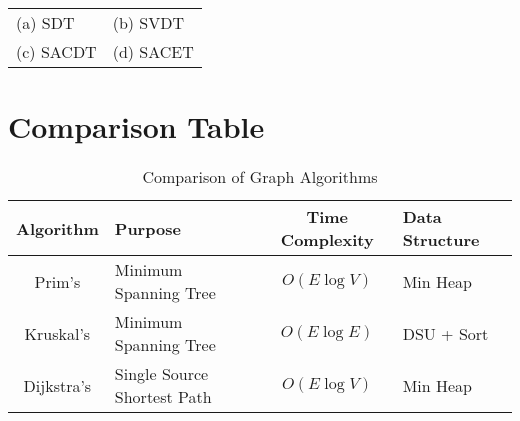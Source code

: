 \documentclass[a4paper,14pt]{extarticle}
\renewcommand{\arraystretch}{1.3}
\begin{document}



\vspace{1cm}

\begin{tabular}{ll}
(a) SDT \hspace{4cm} & (b) SVDT \\
(c) SACDT \hspace{4cm} & (d) SACET \\
\end{tabular}



\newpage
\section{Comparison Table}

\begin{table}[h!]
\renewcommand{\arraystretch}{1.4}
\begin{tabularx}{\textwidth}{|c|Y|c|Y|}
\hline
\textbf{Algorithm} & \textbf{Purpose} & \textbf{Time Complexity} & \textbf{Data Structure} \\
\hline
Prim's     & Minimum Spanning Tree         & \(O(E \log V)\) & Min Heap \\
Kruskal's  & Minimum Spanning Tree         & \(O(E \log E)\) & DSU + Sort \\
Dijkstra's & Single Source Shortest Path   & \(O(E \log V)\) & Min Heap \\
\hline
\end{tabularx}
\caption{Comparison of Graph Algorithms}
\end{table}

\end{document}
